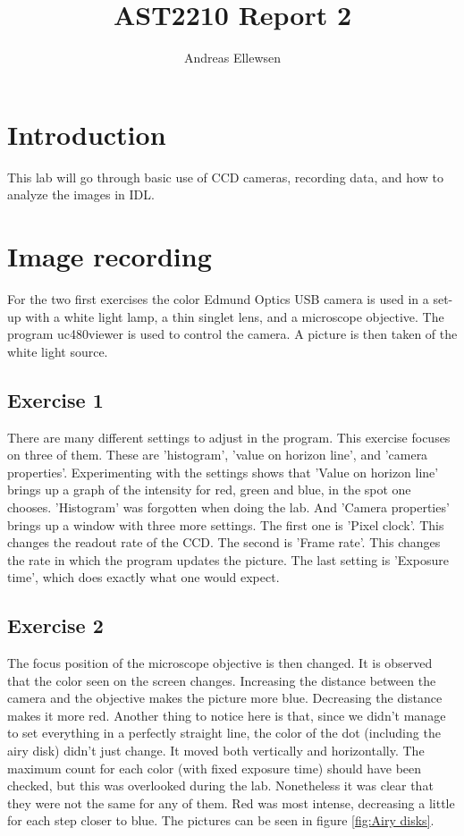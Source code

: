 \documentclass[a4paper,12pt]{article}
\title{AST2210 Report 2}
\author{Andreas Ellewsen}
\begin{document}
\maketitle
\tableofcontents
\section{Introduction}
This lab will go through basic use of CCD cameras, recording data, and how to analyze the images in IDL. 
\section{Image recording}
For the two first exercises the color Edmund Optics USB camera is used in a set-up with a white light lamp, a thin singlet lens, and a microscope objective. The program uc480viewer is used to control the camera. A picture is then taken of the white light source.

\subsection{Exercise 1}
There are many different settings to adjust in the program. This exercise focuses on three of them. These are 'histogram', 'value on horizon line', and 'camera properties'. 
Experimenting with the settings shows that 'Value on horizon line' brings up a graph of the intensity for red, green and blue, in the spot one chooses. 'Histogram' was forgotten when doing the lab. And 'Camera properties' brings up a window with three more settings. The first one is 'Pixel clock'. This changes the readout rate of the CCD. The second is 'Frame rate'. This changes the rate in which the program updates the picture. The last setting is 'Exposure time', which does exactly what one would expect. 

\subsection{Exercise 2}
The focus position of the microscope objective is then changed. It is observed that the color seen on the screen changes. Increasing the distance between the camera and the objective makes the picture more blue. Decreasing the distance makes it more red. Another thing to notice here is that, since we didn't manage to set everything in a perfectly straight line, the color of the dot (including the airy disk) didn't just change. It moved both vertically and horizontally. The maximum count for each color (with fixed exposure time) should have been checked, but this was overlooked during the lab. Nonetheless it was clear that they were not the same for any of them. Red was most intense, decreasing a little for each step closer to blue. The pictures can be seen in figure \ref{fig:Airy disks}.
\end{document}
